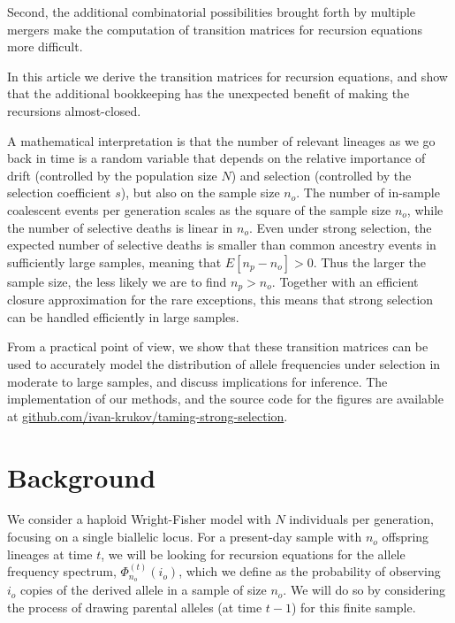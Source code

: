 \documentclass[review,nonatbib]{elsarticle}
\newcommand{\afs}[2]{\Phi_{#1}^{(#2)}}
\begin{document}
Second, the additional combinatorial possibilities brought forth by multiple mergers  make the
computation of transition matrices for recursion equations more difficult.

In this article we derive the transition matrices for recursion equations, and show that the
additional bookkeeping has the unexpected benefit of making the recursions almost-closed. 

A mathematical interpretation is that the number of relevant lineages as we go back 
in time is a random variable that depends on the relative importance of drift (controlled by 
the population size $N$) and selection (controlled by the selection coefficient $s$), 
but also on the sample size $n_o$.  The number of in-sample
coalescent events per generation scales as the square of the sample size $n_o$, while the number of
selective deaths is linear in $n_o$. Even under strong selection, the expected number of
selective deaths is smaller than common ancestry events in sufficiently large samples, meaning that 
$E[n_p- n_o]> 0.$ Thus the larger the sample size, the less likely we are to find $n_p>n_o.$
Together with an efficient closure approximation for the rare exceptions, this means that strong 
selection can be handled efficiently in large samples. 


From a practical point of view, we show that these transition matrices can 
be used to accurately model the distribution of allele frequencies under 
selection in moderate to large samples, and discuss implications for inference.
The implementation of our methods,
and the source code for the figures are available at
\url{github.com/ivan-krukov/taming-strong-selection}.


\section{Background}
\label{sec_background}

We consider a haploid Wright-Fisher model with $N$ individuals per generation, focusing on a single
biallelic locus. For a present-day sample with $n_o$ offspring lineages at time $t$, we will be
looking for recursion equations for the allele frequency spectrum, $\afs{n_o}{t}(i_o)$, which we
define as the probability of observing $i_o$ copies of the derived allele in a sample of size $n_o$.
We will do so by considering the process of drawing parental alleles (at time $t-1$) for this finite
sample.
\end{document}
